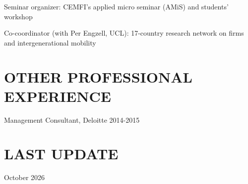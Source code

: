 \documentclass[margin]{res} %
\begin{document}
\begin{resume}
Seminar organizer: CEMFI's applied micro seminar (AMiS) and students' workshop

Co-coordinator (with Per Engzell, UCL): 17-country research network on firms and intergenerational mobility

 
\section{OTHER PROFESSIONAL EXPERIENCE}
 
 Management Consultant, Deloitte \hfill 2014-2015 

\vfill

\section{LAST UPDATE}
October 2026

\end{resume}
\end{document}
